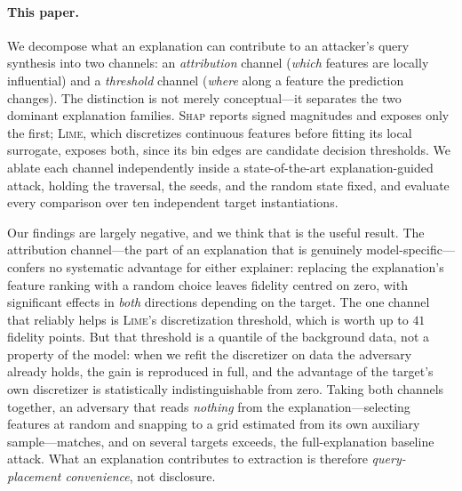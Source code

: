 \documentclass[sigconf,anonymous,review]{acmart}
\begin{document}
\paragraph{This paper.} We decompose what an explanation can contribute to an attacker's query
synthesis into two channels: an \emph{attribution} channel (\emph{which} features are locally
influential) and a \emph{threshold} channel (\emph{where} along a feature the prediction changes).
The distinction is not merely conceptual---it separates the two dominant explanation families.
\textsc{Shap} reports signed magnitudes and exposes only the first; \textsc{Lime}, which discretizes
continuous features before fitting its local surrogate, exposes both, since its bin edges are
candidate decision thresholds. We ablate each channel independently inside a state-of-the-art
explanation-guided attack, holding the traversal, the seeds, and the random state fixed, and evaluate
every comparison over ten independent target instantiations.

Our findings are largely negative, and we think that is the useful result. The attribution
channel---the part of an explanation that is genuinely model-specific---confers no systematic
advantage for either explainer: replacing the explanation's feature ranking with a random choice
leaves fidelity centred on zero, with significant effects in \emph{both} directions depending on the
target. The one channel that reliably helps is \textsc{Lime}'s discretization threshold, which is
worth up to $41$ fidelity points. But that threshold is a quantile of the background data, not a
property of the model: when we refit the discretizer on data the adversary already holds, the gain is
reproduced in full, and the advantage of the target's own discretizer is statistically
indistinguishable from zero. Taking both channels together, an adversary that reads \emph{nothing}
from the explanation---selecting features at random and snapping to a grid estimated from its own
auxiliary sample---matches, and on several targets exceeds, the full-explanation baseline attack.
What an explanation contributes to extraction is therefore \emph{query-placement convenience}, not
disclosure.
\end{document}
